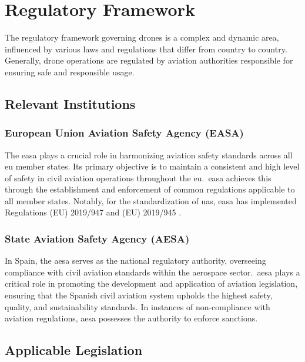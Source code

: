 \chapter{Regulatory Framework}\label{ch:regulatory_framework}

The regulatory framework governing drones is a complex and dynamic area, influenced by various laws and regulations that differ from country to country. Generally, drone operations are regulated by aviation authorities responsible for ensuring safe and responsible usage.

\section{Relevant Institutions}

\subsection{European Union Aviation Safety Agency (EASA)}
The \gls{easa} \autocite{eu-1139-2018} plays a crucial role in harmonizing aviation safety standards across all \gls{eu} member states. Its primary objective is to maintain a consistent and high level of safety in civil aviation operations throughout the \gls{eu}.\ \gls{easa} achieves this through the establishment and enforcement of common regulations applicable to all member states. Notably, for the standardization of \gls{uas}, \gls{easa} has implemented Regulations (EU) 2019/947 \autocite{eu-947-2019} and (EU) 2019/945 \autocite{eu-945-2019}.

\subsection{State Aviation Safety Agency (AESA)}
In Spain, the \gls{aesa} \autocite{sp-184-2008} serves as the national regulatory authority, overseeing compliance with civil aviation standards within the aerospace sector.\ \gls{aesa} plays a critical role in promoting the development and application of aviation legislation, ensuring that the Spanish civil aviation system upholds the highest safety, quality, and sustainability standards. In instances of non-compliance with aviation regulations, \gls{aesa} possesses the authority to enforce sanctions.

\section{Applicable Legislation}

